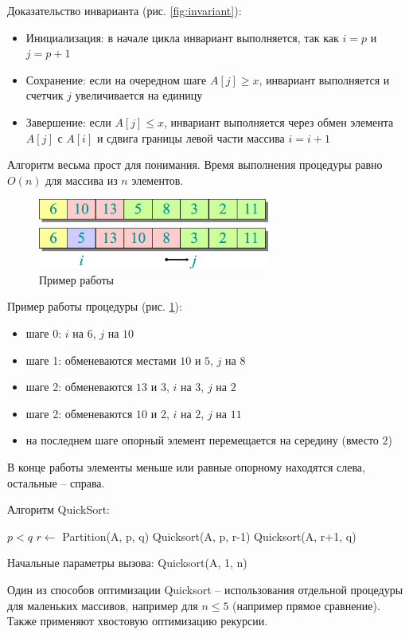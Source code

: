 \documentclass[11pt]{article}
\begin{document}
Доказательство инварианта (рис. \ref{fig:invariant}):
\nopagebreak
\begin{itemize}
\item Инициализация: в начале цикла инвариант выполняется, так как $i = p$ и $j = p+1$ 
\item Сохранение: если на очередном шаге $A[j] \geqslant x$, инвариант выполняется и счетчик $j$ увеличивается на единицу
\item Завершение: если $A[j] \leqslant x$, инвариант выполняется через обмен элемента $A[j]$ с $A[i]$ и сдвига границы левой части массива $i = i+1$
\end{itemize}

Алгоритм весьма прост для понимания. Время выполнения процедуры равно $O(n)$ для массива из $n$ элементов.
\begin{figure}[ht]
  \centering
  \includegraphics[width=3in]{lecture4/example1.eps}
  \caption{Пример работы}
  \label{fig:example1}
\end{figure}

Пример работы процедуры (рис. \ref{fig:example1}):
\begin{itemize}
\item шаге 0: $i$ на $6$, $j$ на $10$
\item шаге 1: обменеваются местами $10$ и $5$, $j$ на $8$
\item шаге 2: обменеваются $13$ и $3$, $i$ на $3$, $j$ на $2$
\item шаге 2: обменеваются $10$ и $2$, $i$ на $2$, $j$ на $11$
\item на последнем шаге опорный элемент перемещается на середину (вместо $2$) 
\end{itemize}
В конце работы элементы меньше или равные опорному находятся слева, остальные -- справа.

Алгоритм QuickSort:
\nopagebreak
\begin{codebox}
\li	\If $p < q$
\li		\Then $r \gets $ Partition(A, p, q)
\li			Quicksort(A, p, r-1)
\li			Quicksort(A, r+1, q)
	\End
\End
\end{codebox}

Начальные параметры вызова: Quicksort(A, 1, n)

Один из способов оптимизации Quicksort -- использования отдельной процедуры для маленьких массивов, например для $n \leqslant 5$ (например прямое сравнение). Также применяют хвостовую оптимизацию рекурсии.
\end{document}
